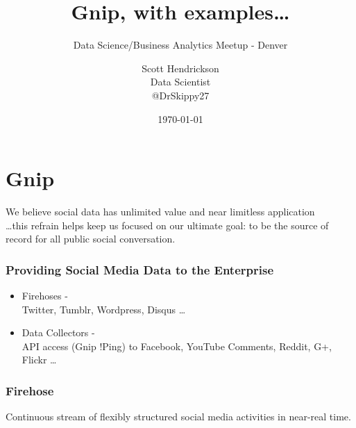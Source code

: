 \documentclass{beamer}
\begin{document}
\title{Gnip, with examples\ldots}
\subtitle{Data Science/Business Analytics Meetup - Denver}
\author{Scott Hendrickson \\ Data Scientist \\  @DrSkippy27}
\date{\today} 


\begin{frame}
\titlepage
\end{frame}

%
%

\section{Gnip}


\begin{frame}
\begin{center}
\Large We believe social data has unlimited value and near limitless application \\ [12pt] \ldots this refrain helps keep us focused on our ultimate goal: to be the source of record for all public social conversation.
\end{center}
\end{frame}


\begin{frame}\frametitle{Providing Social Media Data to the Enterprise}
\begin{center}
\begin{itemize}
\item Firehoses - \\ Twitter, Tumblr, Wordpress, Disqus \ldots
\item Data Collectors - \\ API access (Gnip !Ping) to Facebook, YouTube Comments, Reddit, G+, Flickr \ldots
\end{itemize}
\end{center}
\end{frame}


\begin{frame}\frametitle{Firehose}
\begin{center}
{\Large Continuous stream of flexibly structured social media activities in near-real time.}
\end{center}
\end{frame}

\end{document}
